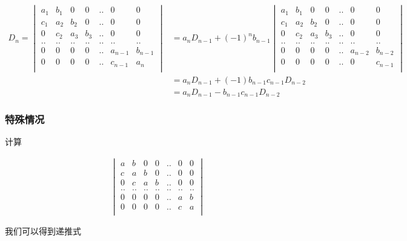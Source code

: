 \documentclass[12pt,a4paper]{ctexart}
\begin{document}
\begin{align*}
    D_n = \begin{vmatrix}
        a_1 & b_1 & 0 & 0 & .. & 0 & 0 \\
        c_1 & a_2 & b_2 & 0 & .. & 0 & 0 \\
        0 & c_2 & a_3 & b_3 & .. & 0 & 0 \\
        .. & .. & .. & .. & .. & .. & .. \\
        0 & 0 & 0 & 0 & ..& a_{n-1} & b_{n-1} \\
        0 & 0 & 0 & 0 & .. & c_{n-1} & a_n \\
    \end{vmatrix} &= a_nD_{n-1} + (-1)^nb_{n-1} \begin{vmatrix}
        a_1 & b_1 & 0 & 0 & .. & 0 & 0 \\
        c_1 & a_2 & b_2 & 0 & .. & 0 & 0 \\
        0 & c_2 & a_3 & b_3 & .. & 0 & 0 \\
        .. & .. & .. & .. & .. & .. & .. \\
        0 & 0 & 0 & 0 & ..& a_{n-2} & b_{n-2} \\
        0 & 0 & 0 & 0 & .. & 0 & c_{n-1} \\
    \end{vmatrix}  \\
    &= a_nD_{n-1} + (-1)b_{n-1}c_{n-1}D_{n-2} \\
    &= a_nD_{n-1} - b_{n-1}c_{n-1}D_{n-2}
\end{align*}

\subsubsection{特殊情况}

计算

\begin{align*}
\begin{vmatrix}
    a & b & 0 & 0 & .. & 0 & 0 \\
    c & a & b & 0 & .. & 0 & 0 \\
    0 & c & a & b & .. & 0 & 0 \\
    .. & .. & .. & .. & .. & .. & .. \\
    0 & 0 & 0 & 0 & ..& a & b \\
    0 & 0 & 0 & 0 & .. & c & a \\
\end{vmatrix}
\end{align*}

我们可以得到递推式 
\end{document}

